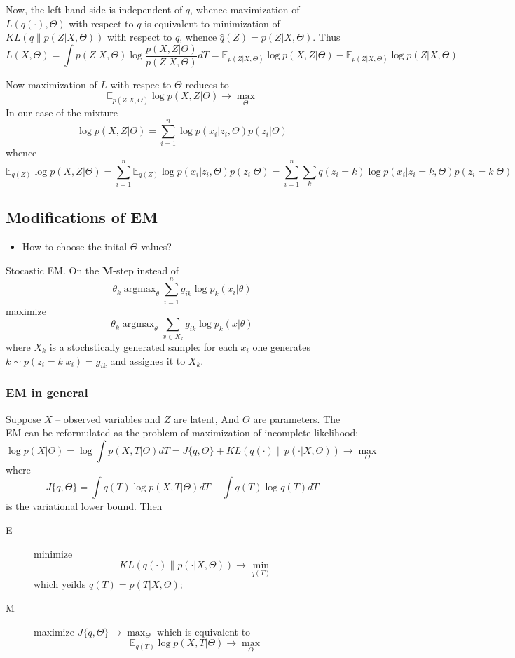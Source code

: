 \documentclass[a4paper]{article}
\newcommand{\ex}{\mathbb{E}}
\newcommand{\argmax}{\mathop{\text{argmax}}}
\begin{document}
Now, the left hand side is independent of $q$, whence maximization of $L(q(\cdot),\Theta)$
with respect to $q$ is equivalent to minimization of $KL(q\|p(Z|X,\Theta))$ with respect
to $q$, whence $\hat{q}(Z) = p(Z|X,\Theta)$. Thus
\[
L(X,\Theta)
= \int p(Z|X,\Theta) \log \frac{p(X,Z|\Theta)}{p(Z|X,\Theta)} dT
= \ex_{p(Z|X,\Theta)} \log p(X,Z|\Theta) - \ex_{p(Z|X,\Theta)} \log p(Z|X,\Theta)
\]

Now maximization of $L$ with respec to $\Theta$ reduces to
\[ \ex_{p(Z|X,\Theta)} \log p(X,Z|\Theta) \to \max_\Theta \]
In our case of the mixture
\[
\log p(X,Z|\Theta)
= \sum_{i=1}^n \log p(x_i|z_i,\Theta) p(z_i|\Theta)
\]
whence
\[
\ex_{q(Z)} \log p(X,Z|\Theta)
= \sum_{i=1}^n \ex_{q(Z)} \log p(x_i|z_i,\Theta) p(z_i|\Theta)
= \sum_{i=1}^n \sum_k q(z_i=k) \log p(x_i|z_i=k,\Theta) p(z_i=k|\Theta)
\]


\subsection{Modifications of EM} %
\label{sub:modifications_of_em}

\begin{itemize}
	\item How to choose the inital $\Theta$ values? 
\end{itemize}

Stocastic EM. On the \textbf{M}-step instead of 
\[ \theta_k \argmax_\theta \sum_{i=1}^n g_{ik} \log p_k(x_i|\theta) \]
maximize
\[ \theta_k \argmax_\theta \sum_{x\in X_k} g_{ik} \log p_k(x|\theta) \]
where $X_k$ is a stochstically generated sample: for each $x_i$ one
generates $k\sim p(z_i=k|x_i) = g_{ik}$ and assignes it to $X_k$.


\subsubsection{EM in general} %
\label{ssub:em_in_general}

Suppose $X$ -- observed variables and $Z$ are latent, And $\Theta$ are parameters.
The EM can be reformulated as the problem of maximization of incomplete likelihood:
\[
\log p(X|\Theta)
= \log \int p(X,T|\Theta) dT
= J\{q,\Theta\} + KL(q(\cdot)\|p(\cdot|X,\Theta)) \to \max_\Theta
\]
where 
\[J\{q,\Theta\} = \int q(T) \log p(X,T|\Theta) dT - \int q(T) \log q(T) dT \]
is the variational lower bound. Then \begin{description}
	\item[E] minimize 
	\[KL(q(\cdot)\|p(\cdot|X,\Theta)) \to \min_{q(T)}\] which yeilds $q(T) = p(T|X,\Theta)$;
	\item[M] maximize $J\{q,\Theta\} \to \max_\Theta$ which is equivalent to
		\[\ex_{q(T)} \log p(X,T|\Theta) \to \max_\Theta\]
\end{description} 
\end{document}
